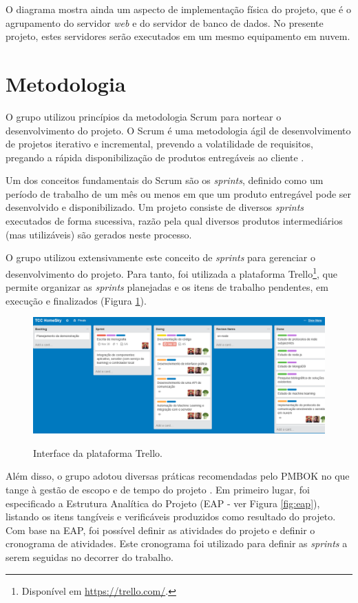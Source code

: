O diagrama mostra ainda um aspecto de implementação física do projeto, que é o agrupamento do servidor \textit{web} e do servidor de banco de dados. No presente projeto, estes servidores serão executados em um mesmo equipamento em nuvem.

\section{Metodologia} \label{sec:metodologia}
O grupo utilizou princípios da metodologia Scrum para nortear o desenvolvimento do projeto. O Scrum é uma metodologia ágil de desenvolvimento de projetos iterativo e incremental, prevendo a volatilidade de requisitos, pregando a rápida disponibilização de produtos entregáveis ao cliente \cite{schwaber2016}.

Um dos conceitos fundamentais do Scrum são os \textit{sprints}, definido como um período de trabalho de um mês ou menos em que um produto entregável pode ser desenvolvido e disponibilizado. Um projeto consiste de diversos \textit{sprints} executados de forma sucessiva, razão pela qual diversos produtos intermediários (mas utilizáveis) são gerados neste processo.

O grupo utilizou extensivamente este conceito de \textit{sprints} para gerenciar o desenvolvimento do projeto. Para tanto, foi utilizada a plataforma Trello\footnote{Disponível em \url{https://trello.com/}.}, que permite organizar as \textit{sprints} planejadas e os itens de trabalho pendentes, em execução e finalizados (Figura \ref{fig:interface_trello}).

\begin{figure}[h]
	\centering
	\caption{Interface da plataforma Trello.}
  \includegraphics[width=\textwidth]{imagens/interface_trello.png}
  \label{fig:interface_trello}  
\end{figure}

Além disso, o grupo adotou diversas práticas recomendadas pelo PMBOK no que tange à gestão de escopo e de tempo do projeto \cite{pmbok}. Em primeiro lugar, foi especificado a Estrutura Analítica do Projeto (EAP - ver Figura \ref{fig:eap}), listando os itens tangíveis e verificáveis produzidos como resultado do projeto. Com base na EAP, foi possível definir as atividades do projeto e definir o cronograma de atividades. Este cronograma foi utilizado para definir as \textit{sprints} a serem seguidas no decorrer do trabalho.

